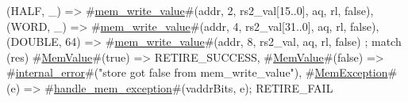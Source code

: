 {{{{{{            (HALF, _)     => #\hyperref[sailRISCVzmemzywritezyvalue]{mem\_write\_value}#(addr, 2, rs2_val[15..0], aq, rl, false),
            (WORD, _)     => #\hyperref[sailRISCVzmemzywritezyvalue]{mem\_write\_value}#(addr, 4, rs2_val[31..0], aq, rl, false),
            (DOUBLE, 64) => #\hyperref[sailRISCVzmemzywritezyvalue]{mem\_write\_value}#(addr, 8, rs2_val,        aq, rl, false)
          };
          match (res) {
            #\hyperref[sailRISCVzMemValue]{MemValue}#(true)  => RETIRE_SUCCESS,
            #\hyperref[sailRISCVzMemValue]{MemValue}#(false) => #\hyperref[sailRISCVzinternalzyerror]{internal\_error}#("store got false from mem_write_value"),
            #\hyperref[sailRISCVzMemException]{MemException}#(e) => { #\hyperref[sailRISCVzhandlezymemzyexception]{handle\_mem\_exception}#(vaddrBits, e); RETIRE_FAIL }
          }
        }
      }
    }
  }
}
